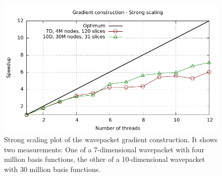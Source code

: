 \documentclass{article}
\begin{document}
\begin{figure}[H]
  \centering
  \includegraphics[width=1.0\textwidth]{plots/grad_eval_omp}
  \caption{
    Strong scaling plot of the wavepacket gradient construction.
    It shows two measurements: One of a 7-dimensional wavepacket with
    four million basis functions, the other of a 10-dimensional wavepacket with
    30 million basis functions.
  }
  \label{fig:grad_eval_omp}
\end{figure}
\end{document}
